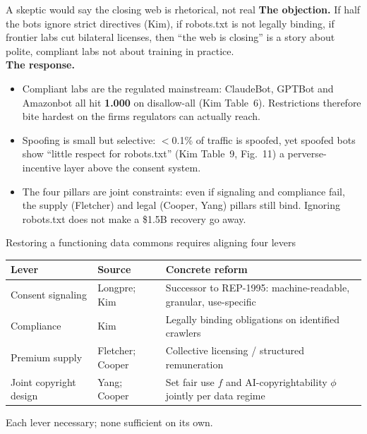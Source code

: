 \documentclass[aspectratio=169,11pt]{beamer}
\begin{document}
\begin{frame}{A skeptic would say the closing web is rhetorical, not real}
\vspace{0.1cm}
\textbf{The objection.} If half the bots ignore strict directives (Kim), if robots.txt is not legally binding, if frontier labs cut bilateral licenses, then ``the web is closing'' is a story about polite, compliant labs \textemdash{} not about training in practice.\\[0.4cm]
\textbf{The response.}
\begin{itemize}
\item \alert{Compliant labs are the regulated mainstream}: ClaudeBot, GPTBot and Amazonbot all hit \textbf{1.000} on disallow-all (Kim Table~6). Restrictions therefore bite hardest on the firms regulators can actually reach.
\item \alert{Spoofing is small but selective}: $<$0.1\% of traffic is spoofed, yet spoofed bots show ``little respect for robots.txt'' (Kim Table~9, Fig.~11) \textemdash{} a perverse-incentive layer above the consent system.
\item \alert{The four pillars are joint constraints}: even if signaling and compliance fail, the supply (Fletcher) and legal (Cooper, Yang) pillars still bind. Ignoring robots.txt does not make a \$1.5B recovery go away.
\end{itemize}
\end{frame}

\begin{frame}{Restoring a functioning data commons requires aligning four levers}
\begin{center}
\renewcommand{\arraystretch}{1.05}
\begin{tabular}{@{}>{\columncolor{LightGray}}p{3.0cm}>{\RaggedRight\arraybackslash}p{4.0cm}>{\RaggedRight\arraybackslash}p{5.4cm}@{}}
\toprule
\textbf{Lever} & \textbf{Source} & \textbf{Concrete reform} \\
\midrule
Consent signaling & Longpre; Kim & Successor to REP-1995: machine-readable, granular, use-specific \\
Compliance & Kim & Legally binding obligations on identified crawlers \\
Premium supply & Fletcher; Cooper & Collective licensing / structured remuneration \\
Joint copyright design & Yang; Cooper & Set fair use $f$ and AI-copyrightability $\phi$ jointly per data regime \\
\bottomrule
\end{tabular}
\end{center}
\begin{flushright}
\footnotesize\textcolor{WarmGray}{Each lever necessary; none sufficient on its own.}
\end{flushright}
\end{frame}
\end{document}

